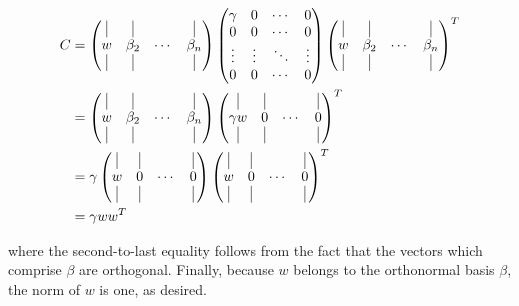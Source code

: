 \begin{solution}
    \begin{align*}
        C &= \begin{pmatrix}
            \vline & \vline & & \vline \\
            w & \beta_2 & \cdots & \beta_n \\
            \vline & \vline & & \vline
        \end{pmatrix} \begin{pmatrix}
            \gamma & 0 & \cdots & 0 \\
            0 & 0 & \cdots & 0 \\
            \vdots & \vdots & \ddots & \vdots \\
            0 & 0 & \cdots & 0
        \end{pmatrix} \begin{pmatrix}
            \vline & \vline & & \vline \\
            w & \beta_2 & \cdots & \beta_n \\
            \vline & \vline & & \vline
        \end{pmatrix}^T  \\
        &= \begin{pmatrix}
            \vline & \vline & & \vline \\
            w & \beta_2 & \cdots & \beta_n \\
            \vline & \vline & & \vline
        \end{pmatrix} \begin{pmatrix}
            \vline & \vline & & \vline \\
            \gamma w & 0 & \cdots & 0 \\
            \vline & \vline & & \vline
        \end{pmatrix}^T \\
        &= \gamma \begin{pmatrix}
            \vline & \vline & & \vline \\
            w & 0 & \cdots & 0 \\
            \vline & \vline & & \vline
        \end{pmatrix} \begin{pmatrix}
            \vline & \vline & & \vline \\
            w & 0 & \cdots & 0 \\
            \vline & \vline & & \vline
        \end{pmatrix}^T \\
        &= \gamma w w^T
    \end{align*}

    where the second-to-last equality follows from the fact that the vectors which comprise $\beta$ are orthogonal.
    Finally, because $w$ belongs to the orthonormal basis $\beta$, the norm of $w$ is one, as desired.
    \ \\
\end{solution}
